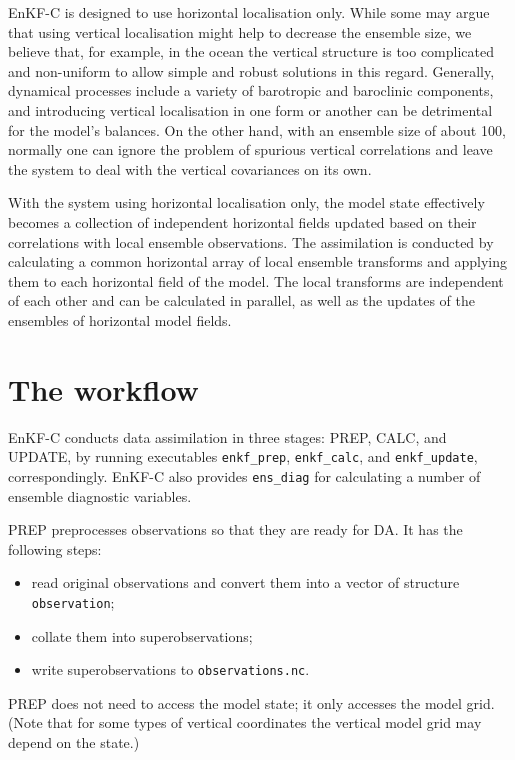 \documentclass[11pt]{report}
\begin{document}
EnKF-C is designed to use horizontal localisation only.
While some may argue that using vertical localisation might help to decrease the ensemble size, we believe that, for example, in the ocean the vertical structure is too complicated and non-uniform to allow simple and robust solutions in this regard.
Generally, dynamical processes include a variety of barotropic and baroclinic components, and introducing vertical localisation in one form or another can be detrimental for the model's balances.
On the other hand, with an ensemble size of about 100, normally one can ignore the problem of spurious vertical correlations and leave the system to deal with the vertical covariances on its own.

With the system using horizontal localisation only, the model state effectively becomes a collection of independent horizontal fields updated based on their correlations with local ensemble observations.
The assimilation is conducted by calculating a common horizontal array of local ensemble transforms and applying them to each horizontal field of the model.
The local transforms are independent of each other and can be calculated in parallel, as well as the updates of the ensembles of horizontal model fields.

\section{The workflow}

EnKF-C conducts data assimilation in three stages: PREP, CALC, and UPDATE, by running executables \verb|enkf_prep|, \verb|enkf_calc|, and \verb|enkf_update|, correspondingly.
EnKF-C also provides \verb|ens_diag| for calculating a number of ensemble diagnostic variables.

PREP preprocesses observations so that they are ready for DA.
It has the following steps:
\begin{itemize}
\item read original observations and convert them into a vector of structure \verb|observation|;
\item collate them into superobservations;
\item write superobservations to \verb|observations.nc|.
\end{itemize}

PREP does not need to access the model state; it only accesses the model grid.
(Note that for some types of vertical coordinates the vertical model grid may depend on the state.)
\end{document}
